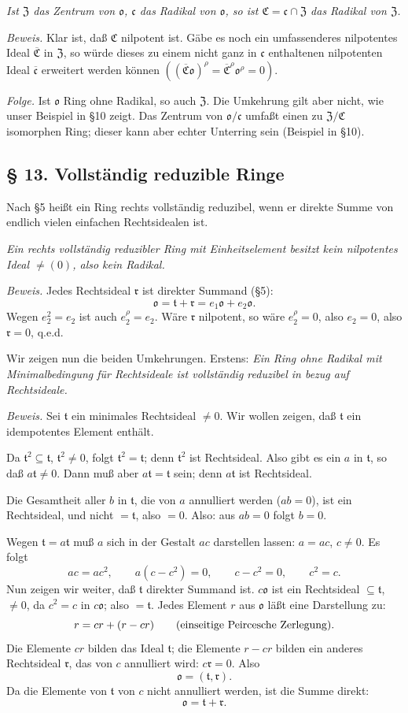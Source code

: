 \documentclass[11pt]{article}
\providecommand{\mC}{\mathfrak{C}}
\providecommand{\mo}{\mathfrak{o}}
\providecommand{\mc}{\mathfrak{c}}
\providecommand{\mr}{\mathfrak{r}}
\providecommand{\mt}{\mathfrak{t}}
\providecommand{\mZ}{\mathfrak{Z}}
\begin{document}
\emph{Ist $\mZ$ das Zentrum von $\mo$, $\mc$ das Radikal von $\mo$, so ist $\mC=\mc\cap\mZ$ das Radikal von $\mZ$.}

\emph{Beweis.} Klar ist, daß $\mC$ nilpotent ist. Gäbe es noch ein umfassenderes nilpotentes Ideal $\overline{\mC}$ in $\mZ$, so würde dieses zu einem nicht ganz in $\mc$ enthaltenen nilpotenten Ideal $\overline{\mc}$ erweitert werden können $((\overline{\mC}\mo)^\rho=\overline{\mC}^{\rho}\mo^\rho=0)$.

\emph{Folge.} Ist $\mo$ Ring ohne Radikal, so auch $\mZ$. Die Umkehrung gilt aber nicht, wie unser Beispiel in §10 zeigt. Das Zentrum von $\mo/\mc$ umfaßt einen zu $\mZ/\mC$ isomorphen Ring; dieser kann aber echter Unterring sein (Beispiel in §10).

\subsection*{§ 13. Vollständig reduzible Ringe}

Nach §5 heißt ein Ring rechts vollständig reduzibel, wenn er direkte Summe von endlich vielen einfachen Rechtsidealen ist.

\emph{Ein rechts vollständig reduzibler Ring mit Einheitselement besitzt kein nilpotentes Ideal $\ne(0)$, also kein Radikal.}

\emph{Beweis.} Jedes Rechtsideal $\mr$ ist direkter Summand (§5):
\[
        \mo=\mt+\mr=e_1\mo+e_2\mo.
\]
Wegen $e_2^2=e_2$ ist auch $e_2^\rho=e_2$. Wäre $\mr$ nilpotent, so wäre $e_2^\rho=0$, also $e_2=0$, also $\mr=0$, q.e.d.

Wir zeigen nun die beiden Umkehrungen. Erstens: \emph{Ein Ring ohne Radikal mit Minimalbedingung für Rechtsideale ist vollständig reduzibel in bezug auf Rechtsideale.}

\emph{Beweis.} Sei $\mt$ ein minimales Rechtsideal $\ne0$. Wir wollen zeigen, daß $\mt$ ein idempotentes Element enthält.

Da $\mt^2\subseteq\mt$, $\mt^2\ne0$, folgt $\mt^2=\mt$; denn $\mt^2$ ist Rechtsideal. Also gibt es ein $a$ in $\mt$, so daß $a\mt\ne0$. Dann muß aber $a\mt=\mt$ sein; denn $a\mt$ ist Rechtsideal.

Die Gesamtheit aller $b$ in $\mt$, die von $a$ annulliert werden ($ab=0$), ist ein Rechtsideal, und nicht $=\mt$, also $=0$. Also: aus $ab=0$ folgt $b=0$.

Wegen $\mt=a\mt$ muß $a$ sich in der Gestalt $ac$ darstellen lassen: $a=ac$, $c\ne0$. Es folgt
\[
        ac=ac^2,
        \qquad a(c-c^2)=0,
        \qquad c-c^2=0,
        \qquad c^2=c.
\]
Nun zeigen wir weiter, daß $\mt$ direkter Summand ist. $c\mo$ ist ein Rechtsideal $\subseteq\mt$, $\ne0$, da $c^2=c$ in $c\mo$; also $=\mt$. Jedes Element $r$ aus $\mo$ läßt eine Darstellung zu:
\[
        r=cr+(r-cr) \qquad \hbox{(einseitige Peircesche Zerlegung).}
\]
Die Elemente $cr$ bilden das Ideal $\mt$; die Elemente $r-cr$ bilden ein anderes Rechtsideal $\mr$, das von $c$ annulliert wird: $c\mr=0$. Also
\[
        \mo=(\mt,\mr).
\]
Da die Elemente von $\mt$ von $c$ nicht annulliert werden, ist die Summe direkt:
\begin{equation}
        \mo=\mt+\mr.                                             \tag{1}
\end{equation}
\end{document}
